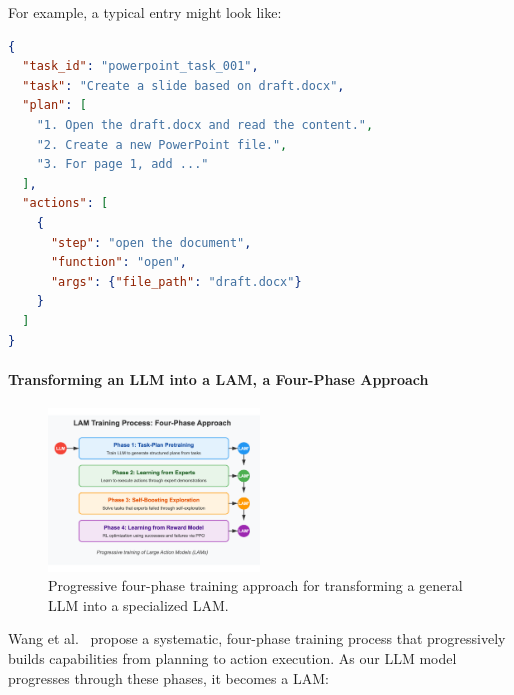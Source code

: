 \documentclass[journal,twoside,10pt]{IEEEtran}
\begin{document}
For example, a typical entry might look like:

\begin{lstlisting}[language=JSON]
{
  "task_id": "powerpoint_task_001",
  "task": "Create a slide based on draft.docx",
  "plan": [
    "1. Open the draft.docx and read the content.",
    "2. Create a new PowerPoint file.",
    "3. For page 1, add ..."
  ],
  "actions": [
    {
      "step": "open the document",
      "function": "open",
      "args": {"file_path": "draft.docx"}
    }
  ]
}
\end{lstlisting}

\paragraph{Transforming an LLM into a LAM, a Four-Phase Approach}

\begin{figure}[htbp]
    \centering
    \includegraphics[width=0.5\textwidth]{traning_phases.pdf}
    \caption{Progressive four-phase training approach for transforming a general LLM into a specialized LAM.}
    \label{fig:lam-training}
\end{figure}

Wang et al.~\cite{wang2025lam} propose a systematic, four-phase training process that progressively builds capabilities from planning to action execution. As our LLM model progresses through these phases, it becomes a LAM:
\end{document}
